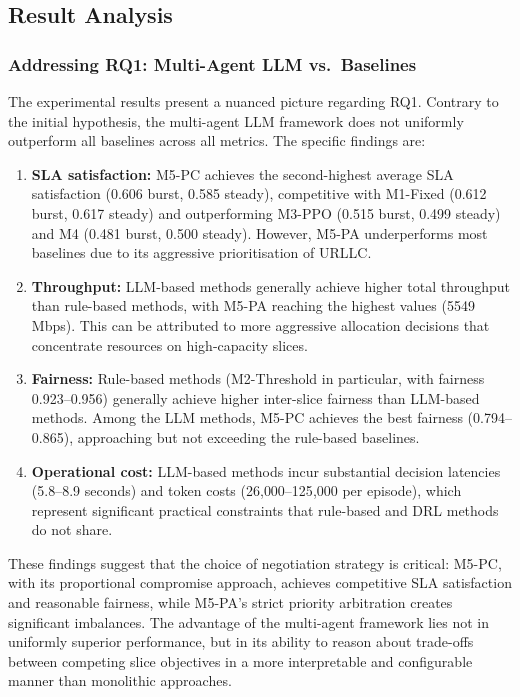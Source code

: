 \subsection{Result Analysis}

\subsubsection{Addressing RQ1: Multi-Agent LLM vs.\ Baselines}

The experimental results present a nuanced picture regarding RQ1. Contrary to the initial hypothesis, the multi-agent LLM framework does not uniformly outperform all baselines across all metrics. The specific findings are:

\begin{enumerate}
    \item \textbf{SLA satisfaction:} M5-PC achieves the second-highest average SLA satisfaction (0.606 burst, 0.585 steady), competitive with M1-Fixed (0.612 burst, 0.617 steady) and outperforming M3-PPO (0.515 burst, 0.499 steady) and M4 (0.481 burst, 0.500 steady). However, M5-PA underperforms most baselines due to its aggressive prioritisation of URLLC.

    \item \textbf{Throughput:} LLM-based methods generally achieve higher total throughput than rule-based methods, with M5-PA reaching the highest values (5549\,Mbps). This can be attributed to more aggressive allocation decisions that concentrate resources on high-capacity slices.

    \item \textbf{Fairness:} Rule-based methods (M2-Threshold in particular, with fairness 0.923--0.956) generally achieve higher inter-slice fairness than LLM-based methods. Among the LLM methods, M5-PC achieves the best fairness (0.794--0.865), approaching but not exceeding the rule-based baselines.

    \item \textbf{Operational cost:} LLM-based methods incur substantial decision latencies (5.8--8.9 seconds) and token costs (26{,}000--125{,}000 per episode), which represent significant practical constraints that rule-based and DRL methods do not share.
\end{enumerate}

These findings suggest that the choice of negotiation strategy is critical: M5-PC, with its proportional compromise approach, achieves competitive SLA satisfaction and reasonable fairness, while M5-PA's strict priority arbitration creates significant imbalances. The advantage of the multi-agent framework lies not in uniformly superior performance, but in its ability to reason about trade-offs between competing slice objectives in a more interpretable and configurable manner than monolithic approaches.

